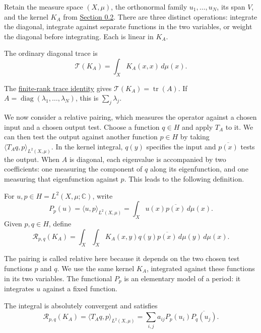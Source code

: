 \label{three-finite-kernel-constructions}

Retain the measure space $(X,\mu)$, the orthonormal family $u_1,\ldots,u_N$, its span $V$, and the kernel $K_A$ from \hyperref[v1a-ch00-s2]{Section 0.2}. There are three distinct operations: integrate the diagonal, integrate against separate functions in the two variables, or weight the diagonal before integrating. Each is linear in $K_A$.

\begin{definition}\label{ordinary-finite-trace}

The ordinary diagonal trace is
\[
\mathcal T(K_A)=\int_XK_A(x,x)\,d\mu(x).
\]
\end{definition}

The \hyperref[finite-kernel-trace-identity]{finite-rank trace identity} gives $\mathcal T(K_A)=\operatorname{tr}(A)$. If $A=\operatorname{diag}(\lambda_1,\ldots,\lambda_N)$, this is $\sum_j\lambda_j$. 


We now consider a relative pairing, which measures the operator against a chosen input and a chosen output test. Choose a function $q\in H$ and apply $T_A$ to it. We can then test the output against another function $p\in H$ by taking $\langle T_Aq,p\rangle_{L^2(X,\mu)}$. In the kernel integral, $q(y)$ specifies the input and $\overline{p(x)}$ tests the output. When $A$ is diagonal, each eigenvalue is accompanied by two coefficients: one measuring the component of $q$ along its eigenfunction, and one measuring that eigenfunction against $p$. This leads to the following definition.

\begin{definition}\label{relative-finite-pairing}

For $u,p\in H=L^2(X,\mu;\mathbb C)$, write
\[
P_p(u)=\langle u,p\rangle_{L^2(X,\mu)}
=\int_Xu(x)\overline{p(x)}\,d\mu(x).
\]
Given $p,q\in H$, define
\[
\mathcal R_{p,q}(K_A)
=\int_X\int_XK_A(x,y)q(y)\overline{p(x)}\,d\mu(y)\,d\mu(x).
\]
\end{definition}

The pairing is called relative here because it depends on the two chosen test functions $p$ and $q$. We use the same kernel $K_A$, integrated against these functions in its two variables. The functional $P_p$ is an elementary model of a period: it integrates $u$ against a fixed function.

\begin{proposition}\label{finite-relative-kernel-identity}
The integral is absolutely convergent and satisfies
\[
\mathcal R_{p,q}(K_A)
=\langle T_Aq,p\rangle_{L^2(X,\mu)}
=\sum_{i,j}a_{ij}P_p(u_i)\overline{P_q(u_j)}.
\]
\end{proposition}

